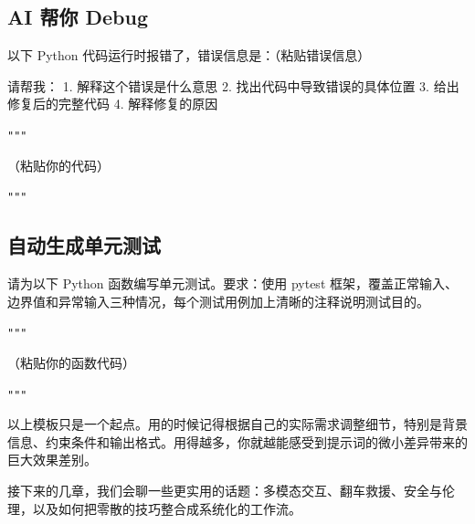 \subsection*{AI 帮你 Debug}

\begin{promptbox}
以下 Python 代码运行时报错了，错误信息是：（粘贴错误信息）

请帮我：
1. 解释这个错误是什么意思
2. 找出代码中导致错误的具体位置
3. 给出修复后的完整代码
4. 解释修复的原因

\verb|"""|

（粘贴你的代码）

\verb|"""|
\end{promptbox}

\subsection*{自动生成单元测试}

\begin{promptbox}
请为以下 Python 函数编写单元测试。要求：使用 pytest 框架，覆盖正常输入、边界值和异常输入三种情况，每个测试用例加上清晰的注释说明测试目的。

\verb|"""|

（粘贴你的函数代码）

\verb|"""|
\end{promptbox}

\bigskip

以上模板只是一个起点。用的时候记得根据自己的实际需求调整细节，特别是背景信息、约束条件和输出格式。用得越多，你就越能感受到提示词的微小差异带来的巨大效果差别。

接下来的几章，我们会聊一些更实用的话题：多模态交互、翻车救援、安全与伦理，以及如何把零散的技巧整合成系统化的工作流。
